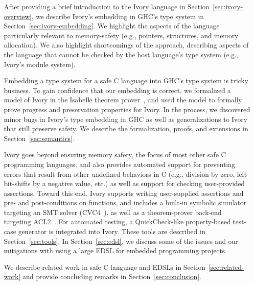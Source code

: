 After providing a brief introduction to the Ivory language in
Section~\ref{sec:ivory-overview}, we describe Ivory's embedding in GHC's type
system in Section~\ref{sec:ivory-embedding}. We highlight the aspects of the
language particularly relevant to memory-safety (e.g., pointers, structures, and
memory allocation). We also highlight shortcomings of the approach, describing
aspects of the language that cannot be checked by the host language's type
system (e.g., Ivory's module system).

Embedding a type system for a safe C language into GHC's type system is tricky
business. To gain confidence that our embedding is correct, we formalized a
model of Ivory in the Isabelle theorem prover~\cite{isabelle}, and used the model to
formally prove progress and preservation properties for Ivory. In the process,
we discovered minor bugs in Ivory's type embedding in GHC as well as
generalizations to Ivory that still preserve safety. We describe the
formalization, proofs, and extensions in Section~\ref{sec:semantics}.

Ivory goes beyond ensuring memory safety, the focus of most other safe C
programming languages, and also provides automated support for preventing errors
that result from other undefined behaviors in C (e.g., division by zero, left
bit-shifts by a negative value, etc.) as well as support for checking
user-provided assertions. Toward this end, Ivory supports writing user-supplied
assertions and pre- and post-conditions on functions, and includes a built-in
symbolic simulator targeting an SMT solver (CVC4~\cite{cvc4}), as well as a
theorem-prover back-end targeting ACL2~\cite{acl2}. For automated testing, a
QuickCheck-like property-based test-case generator is integrated into
Ivory. These tools are described in Section~\ref{sec:tools}. In
Section~\ref{sec:edsl}, we discuss some of the issues and our mitigations with
using a large EDSL for embedded programming projects.

We describe related work in safe C language and EDSLs in
Section~\ref{sec:related-work} and provide concluding remarks in
Section~\ref{sec:conclusion}.



